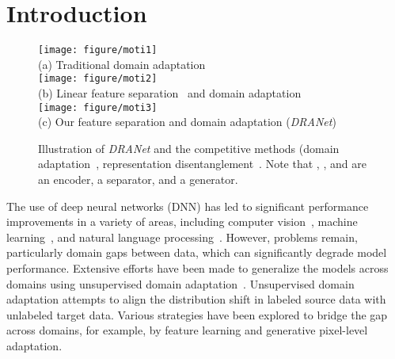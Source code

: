 \documentclass[final]{cvpr}
\begin{document}
\vspace{-3mm}
\section{Introduction}
\label{sec:intro}

\begin{figure}[t] 
	\centering
    \texttt{[image: figure/moti1]}\\
    \small{(a) Traditional domain adaptation~\cite{ganin2016domain,hoffman2018cycada}} \\
    \texttt{[image: figure/moti2]}\\
    \small{(b) Linear feature separation~\cite{zhang2018style}} and domain adaptation\\
    \texttt{[image: figure/moti3]}\\
    \small{(c) Our feature separation and domain adaptation (\textit{DRANet})}\\
    \vspace{2mm}
	\caption{Illustration of \textit{DRANet} and the competitive methods (domain adaptation~\cite{ganin2016domain,hoffman2018cycada}, representation disentanglement~\cite{zhang2018style}. Note that , , and  are an encoder, a separator, and a generator.
	 }
	\label{fig:teaser}
	\vspace{-3mm}
\end{figure}


The use of deep neural networks (DNN) has led to significant performance improvements in a variety of areas, including computer vision~\cite{deng2009imagenet}, machine learning~\cite{goodfellow2016deep}, and natural language processing~\cite{devlin2018bert}.
However, problems remain, particularly domain gaps between data, which can significantly degrade model performance.
Extensive efforts have been made to generalize the models across domains using unsupervised domain adaptation~\cite{ben2006analysis,tzeng2014deep,long2015learning,tzeng2015simultaneous,ganin2016domain,sun2016deep,tzeng2017adversarial,liu2016coupled,bousmalis2017unsupervised,hoffman2018cycada,ye2020light}.
Unsupervised domain adaptation attempts to align the distribution shift in labeled source data with unlabeled target data.
Various strategies have been explored to bridge the gap across domains, for example, by feature learning and generative pixel-level adaptation.
\end{document}
